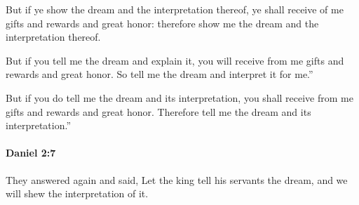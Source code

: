 			\begin{versebox}
					\item[BHS] 
					\item[LXX] 
					\item[ASV] But if ye show the dream and the interpretation thereof, ye shall receive of me gifts and rewards and great honor: therefore show me the dream and the interpretation thereof.
					\item[NIV] But if you tell me the dream and explain it, you will receive from me gifts and rewards and great honor. So tell me the dream and interpret it for me.”
					\item[NRSV] But if you do tell me the dream and its interpretation, you shall receive from me gifts and rewards and great honor. Therefore tell me the dream and its interpretation.”
			\end{versebox}

		\paragraph{Daniel 2:7} %
			\label{DANIEL-2-7}

			They answered again and said, Let the king tell his servants the dream, and we will shew the interpretation of it.

